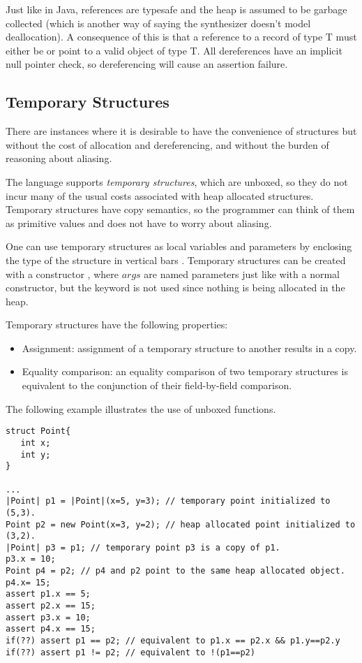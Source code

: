 Just like in Java, references are typesafe and the heap is assumed to be garbage collected (which is another way of saying the synthesizer doesn't model deallocation). A consequence of this is that a reference to a record of type T must either be  or point to a valid object of type T. All dereferences have an implicit null pointer check, so dereferencing  will cause an assertion failure.

\subsection{Temporary Structures}

There are instances where it is desirable to have the convenience of structures but without the cost of allocation and dereferencing, and without the burden of reasoning about aliasing.

The language supports \emph{temporary structures}, which are unboxed, so they do not incur many of the usual costs associated with heap allocated structures. Temporary structures have copy semantics, so the programmer can think of them as primitive values and does not have to worry about aliasing.

One can use temporary structures as local variables and parameters by enclosing the type of the structure in vertical bars . Temporary structures can be created with a constructor , where $args$ are named parameters just like with a normal constructor, but the keyword  is not used since nothing is being allocated in the heap.

Temporary structures have the following properties:
\begin{itemize}
\item Assignment: assignment of a temporary structure to another results in a copy.
\item Equality comparison: an equality comparison of two temporary structures is equivalent to the conjunction of their field-by-field comparison.
\end{itemize}

The following example illustrates the use of unboxed functions.

\begin{Example}
\begin{lstlisting}
struct Point{
   int x;
   int y;
}

...
|Point| p1 = |Point|(x=5, y=3); // temporary point initialized to (5,3).
Point p2 = new Point(x=3, y=2); // heap allocated point initialized to (3,2).
|Point| p3 = p1; // temporary point p3 is a copy of p1.
p3.x = 10;
Point p4 = p2; // p4 and p2 point to the same heap allocated object.
p4.x= 15;
assert p1.x == 5;
assert p2.x == 15;
assert p3.x = 10;
assert p4.x == 15;
if(??) assert p1 == p2; // equivalent to p1.x == p2.x && p1.y==p2.y
if(??) assert p1 != p2; // equivalent to !(p1==p2)
\end{lstlisting}
\end{Example}

